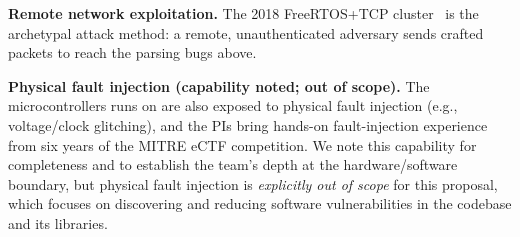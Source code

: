 \noindent\textbf{Remote network exploitation.}
The 2018 FreeRTOS+TCP cluster~\cite{zimperium2018freertos} is the archetypal attack method: a remote, unauthenticated adversary sends crafted packets to reach the parsing bugs above.

\noindent\textbf{Physical fault injection (capability noted; out of scope).}
The microcontrollers \ose{} runs on are also exposed to physical fault injection (e.g., voltage/clock glitching), and the PIs bring hands-on fault-injection experience from six years of the MITRE eCTF competition.
We note this capability for completeness and to establish the team's depth at the hardware/software boundary, but physical fault injection is \emph{explicitly out of scope} for this proposal, which focuses on discovering and reducing software vulnerabilities in the \ose{} codebase and its libraries.
